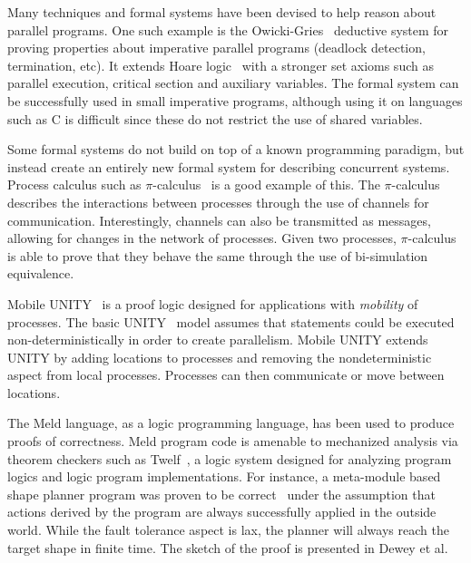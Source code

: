 Many techniques and formal systems have been devised to help reason about
parallel programs.  One such example is the
Owicki-Gries~\cite{Owicki:1976:VPP:360051.360224} deductive system for proving
properties about imperative parallel programs (deadlock detection, termination,
etc). It extends Hoare logic~\cite{Hoare:1969} with a stronger set axioms such
as parallel execution, critical section and auxiliary variables. The formal
system can be successfully used in small imperative programs, although using it
on languages such as C is difficult since these do not restrict the use of
shared variables.

Some formal systems do not build on top of a known programming paradigm, but
instead create an entirely new formal system for describing concurrent systems.
Process calculus such as $\pi$-calculus~\cite{Milner:1999:CMS:329902} is a good
example of this.  The $\pi$-calculus describes the interactions between
processes through the use of channels for communication. Interestingly, channels
can also be transmitted as messages, allowing for changes in the network of
processes.  Given two processes, $\pi$-calculus is able to prove that they
behave the same through the use of bi-simulation equivalence.

Mobile UNITY~\cite{Roman97anintroduction} is a proof logic designed for
applications with \emph{mobility} of processes. The basic UNITY~\cite{UNITY}
model assumes that statements could be executed non-deterministically in order
to create parallelism. Mobile UNITY extends UNITY by adding locations to
processes and removing the nondeterministic aspect from local processes.
Processes can then communicate or move between locations.

The Meld language, as a logic programming language, has been used to produce
proofs of correctness. Meld program code is amenable to mechanized analysis via
theorem checkers such as Twelf~\cite{twelf}, a logic system designed for
analyzing program logics and logic program implementations. For instance, a
meta-module based shape planner program was proven to be
correct~\cite{dewey-iros08,ashley-rollman-iclp09} under the assumption that
actions derived by the program are always successfully applied in the outside
world.  While the fault tolerance aspect is lax, the planner will always reach
the target shape in finite time. The sketch of the proof is presented in Dewey
et al.~\cite{dewey-iros08}
